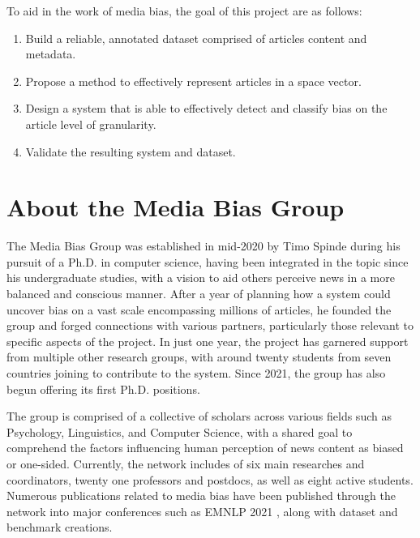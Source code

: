 To aid in the work of media bias, the goal of this project are as follows:
\begin{enumerate}
    \item Build a reliable, annotated dataset comprised of articles content and metadata.
    \item Propose a method to effectively represent articles in a space vector.
    \item Design a system that is able to effectively detect and classify bias on the article level of granularity.
    \item Validate the resulting system and dataset.
\end{enumerate}

\section{About the Media Bias Group}

The Media Bias Group \cite{media-bias-group} was established in mid-2020 by Timo Spinde during his pursuit of a Ph.D. in computer science, having been integrated in the topic since his undergraduate studies, with a vision to aid others perceive news in a more balanced and conscious manner. After a year of planning how a system could uncover bias on a vast scale encompassing millions of articles, he founded the group and forged connections with various partners, particularly those relevant to specific aspects of the project. In just one year, the project has garnered support from multiple other research groups, with around twenty students from seven countries joining to contribute to the system. Since 2021, the group has also begun offering its first Ph.D. positions.

The group is comprised of a collective of scholars across various fields such as Psychology, Linguistics, and Computer Science, with a shared goal to comprehend the factors influencing human perception of news content as biased or one-sided. Currently, the network includes of six main researches and coordinators, twenty one professors and postdocs, as well as eight active students. Numerous publications related to media bias have been published through the network into major conferences such as EMNLP 2021 \cite{spinde-2021-babe}, along with dataset and benchmark creations.


